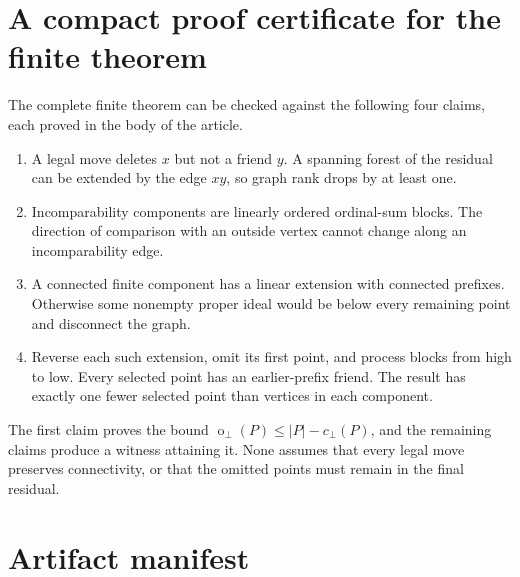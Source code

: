\documentclass[11pt,a4paper]{article}
\theoremstyle{definition}
\theoremstyle{remark}
\newcommand{\fot}{\operatorname{o}_{\perp}}
\newcommand{\cc}{c_{\perp}}
\begin{document}
\appendix
\section{A compact proof certificate for the finite theorem}

The complete finite theorem can be checked against the following four
claims, each proved in the body of the article.
\begin{enumerate}[label=\textbf{\arabic*.},leftmargin=2em,itemsep=0.4em]
\item A legal move deletes $x$ but not a friend $y$. A spanning forest of
the residual can be extended by the edge $xy$, so graph rank drops by at
least one.
\item Incomparability components are linearly ordered ordinal-sum blocks.
The direction of comparison with an outside vertex cannot change along an
incomparability edge.
\item A connected finite component has a linear extension with connected
prefixes. Otherwise some nonempty proper ideal would be below every
remaining point and disconnect the graph.
\item Reverse each such extension, omit its first point, and process blocks
from high to low. Every selected point has an earlier-prefix friend. The
result has exactly one fewer selected point than vertices in each component.
\end{enumerate}
The first claim proves the bound $\fot(P)\le|P|-\cc(P)$, and the remaining
claims produce a witness attaining it. None assumes that every legal move
preserves connectivity, or that the omitted points must remain in the final
residual.

\section{Artifact manifest}
\end{document}
